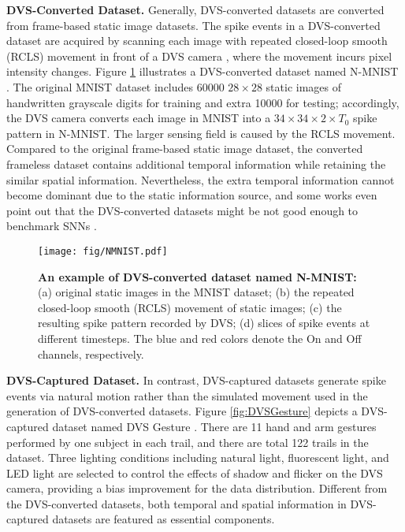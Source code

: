 \documentclass[journal,10pt,twocolumn]{IEEETran}
\begin{document}
\textbf{DVS-Converted Dataset.} Generally, DVS-converted datasets are converted from frame-based static image datasets. The spike events in a DVS-converted dataset are acquired by scanning each image with repeated closed-loop smooth (RCLS) movement in front of a DVS camera \cite{serrano2015poker,li2017cifar10}, where the movement incurs pixel intensity changes. Figure \ref{fig:NMNIST} illustrates a DVS-converted dataset named N-MNIST \cite{orchard2015converting}. The original MNIST dataset includes 60000 $28\times28$ static images of handwritten grayscale digits for training and extra 10000 for testing; accordingly, the DVS camera converts each image in MNIST into a $34 \times 34 \times 2\times T_0$ spike pattern in N-MNIST. The larger sensing field is caused by the RCLS movement. Compared to the original frame-based static image dataset, the converted frameless dataset contains additional temporal information while retaining the similar spatial information. Nevertheless, the extra temporal information cannot become dominant due to the static information source, and some works even point out that the DVS-converted datasets might be not good enough to benchmark SNNs \cite{iyer2018neuromorphic,deng2020rethinking}. 

\begin{figure}[!htbp]
\centering     
\texttt{[image: fig/NMNIST.pdf]}
\caption{\textbf{An example of DVS-converted dataset named N-MNIST:} (a) original static images in the MNIST dataset; (b) the repeated closed-loop smooth (RCLS) movement of static images; (c) the resulting spike pattern recorded by DVS; (d) slices of spike events at different timesteps. The blue and red colors denote the On and Off channels, respectively.} \label{fig:NMNIST} 
\end{figure}

\textbf{DVS-Captured Dataset.} In contrast, DVS-captured datasets generate spike events via natural motion rather than the simulated movement used in the generation of DVS-converted datasets. Figure \ref{fig:DVSGesture} depicts a DVS-captured dataset named DVS Gesture \cite{amir2017low}. There are 11 hand and arm gestures performed by one subject in each trail, and there are total 122 trails in the dataset. Three lighting conditions including natural light, fluorescent light, and LED light are selected to control the effects of shadow and flicker on the DVS camera, providing a bias improvement for the data distribution. Different from the DVS-converted datasets, both temporal and spatial information in DVS-captured datasets are featured as essential components.
\end{document}
